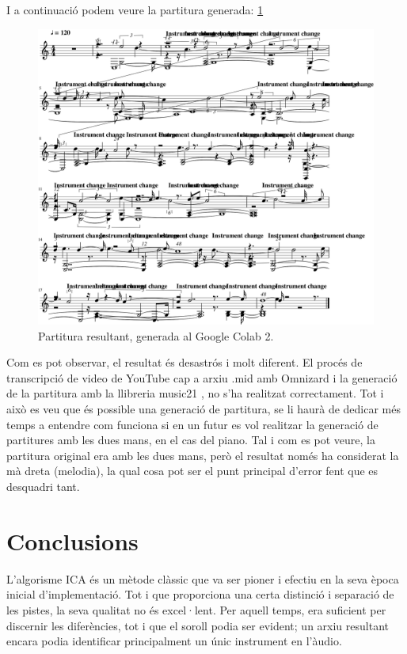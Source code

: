 \documentclass[10pt,a4paper,twocolumn,twoside]{article}
\begin{document}
I a continuació podem veure la partitura generada: \ref{fig:partitura-resultat}
\begin{figure}[h]
    \centering
    \includegraphics[width=1\linewidth]{img/partitura_resultat.png}
    \caption{Partitura resultant, generada al Google Colab 2.}
    \label{fig:partitura-resultat}
\end{figure}

Com es pot observar, el resultat és desastrós i molt diferent. 
El procés de transcripció de video de YouTube cap a arxiu .mid amb Omnizard i la generació de la partitura amb la llibreria music21 \cite{music21-conf/ismir/CuthbertA10}, no s'ha realitzat correctament.
Tot i això es veu que és possible una generació de partitura, se li haurà de dedicar més temps a entendre com funciona si en un futur es vol realitzar la generació de partitures amb les dues mans, en el cas del piano. Tal i com es pot veure, la partitura original era amb les dues mans, però el resultat només ha considerat la mà dreta (melodia), la qual cosa pot ser el punt principal d'error fent que es desquadri tant.

\section{Conclusions}

L'algorisme ICA és un mètode clàssic que va ser pioner i efectiu en la seva època inicial d'implementació. Tot i que proporciona una certa distinció i separació de les pistes, la seva qualitat no és excel·lent. Per aquell temps, era suficient per discernir les diferències, tot i que el soroll podia ser evident; un arxiu resultant encara podia identificar principalment un únic instrument en l'àudio.
\end{document}
